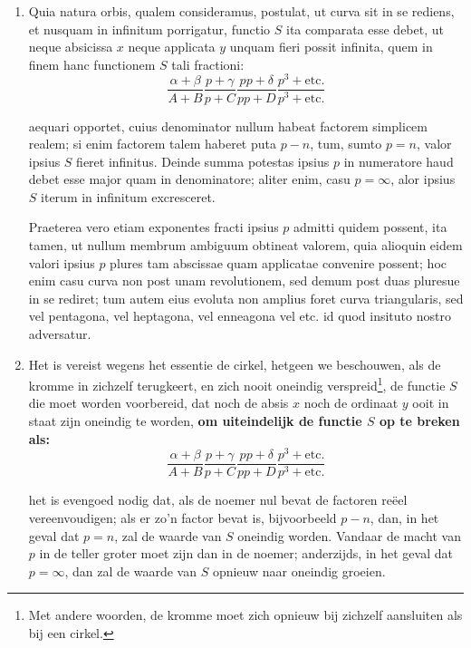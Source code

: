 \documentclass[10pt,a4paper]{article}
\newcommand{\switchenum}{\setcounter{enumi}{\arabic{enumi}-1}\switchcolumn}
\begin{document}
\begin{paracol}{2}
\begin{enumerate}[topsep=1px]
		\switchcolumn*
		
		\item Quia natura orbis, qualem consideramus, postulat, ut curva sit in se rediens, et nusquam in infinitum porrigatur, functio $S$ ita comparata esse debet, ut neque absicissa $x$ neque applicata $y$ unquam fieri possit infinita, quem in finem hanc functionem $S$ tali fractioni:
		\[
			\frac{\alpha+\beta}{A+B}\frac{p+\gamma }{p+C} \frac{p p+\delta}{p p+D} \frac{p^3+\text{etc}.}{p^3+\text{etc}.}
		\]
		\par aequari opportet, cuius denominator nullum habeat factorem simplicem realem; si enim factorem talem haberet puta $p-n$, tum, sumto $p=n$, valor ipsius $S$ fieret infinitus. Deinde summa potestas ipsius $p$ in numeratore haud debet esse major quam in denominatore; aliter enim, casu $p=\infty$, alor ipsius $S$ iterum in infinitum excresceret.
		
		\newpage
		
		Praeterea vero etiam exponentes fracti ipsius $p$ admitti quidem possent, ita tamen, ut nullum membrum ambiguum obtineat valorem, quia alioquin eidem valori ipsius $p$ plures tam abscissae quam applicatae convenire possent; hoc enim casu curva non post unam revolutionem, sed demum post duas pluresue in se rediret; tum autem eius evoluta non amplius foret curva triangularis, sed vel pentagona, vel heptagona, vel enneagona vel etc. id quod insituto nostro adversatur.
		
		\switchenum
		\item Het is vereist wegens het essentie de cirkel, hetgeen we beschouwen, als de kromme in zichzelf terugkeert, en zich nooit oneindig verspreid\footnote{Met andere woorden, de kromme moet zich opnieuw bij zichzelf aansluiten als bij een cirkel.}, de functie $S$ die moet worden voorbereid, dat noch de absis $x$ noch de ordinaat $y$ ooit in staat zijn oneindig te worden, \textbf{om uiteindelijk de functie $S$ op te breken als:}
		\[
			\frac{\alpha+\beta}{A+B}\frac{p+\gamma }{p+C} \frac{p p+\delta}{p p+D} \frac{p^3+\text{etc}.}{p^3+\text{etc}.}
		\]
		\par het is evengoed nodig dat, als de noemer nul bevat de factoren reëel vereenvoudigen; als er zo'n factor bevat is, bijvoorbeeld $p-n$, dan, in het geval dat $p=n$, zal de waarde van $S$ oneindig worden. Vandaar de macht van $p$ in de teller groter moet zijn dan in de noemer; anderzijds, in het geval dat $p=\infty$, dan zal de waarde van $S$ opnieuw naar oneindig groeien.
		
		\newpage
		

\end{enumerate}
\end{paracol}
\end{document}
